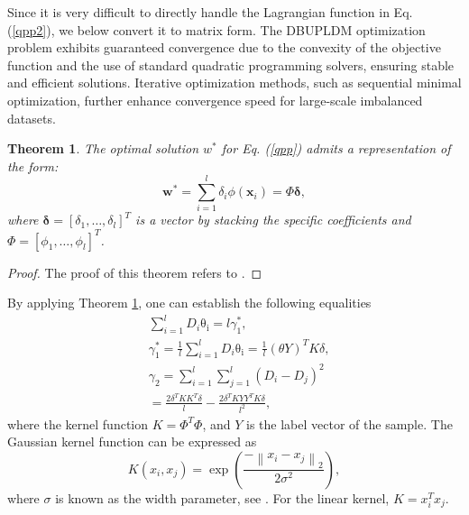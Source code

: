 \documentclass[a4paper]{cas-sc}
\newtheorem{myTheo}{Theorem}
\begin{document}
Since it is very difficult to directly handle the Lagrangian function in Eq. (\ref{qpp2}), we below convert it to matrix form. 
{\color{blue}The DBUPLDM optimization problem exhibits guaranteed convergence due to the convexity of the objective function and the use of standard quadratic programming solvers,  ensuring stable and efficient solutions. Iterative optimization methods, such as sequential minimal optimization, further enhance convergence speed for large-scale imbalanced datasets.}
\begin{myTheo}
\label{theo1}
The optimal solution $w^*$ for Eq. (\ref{qpp}) admits a representation of the form:
\begin{equation}
\label{thor}
\boldsymbol{w}^{*}=\sum_{i=1}^{l} \delta_{i} \phi\left(\boldsymbol{x}_{i}\right)=\Phi \boldsymbol{\delta},
\end{equation}
where $\boldsymbol{\delta}=\left[\delta_{1}, \ldots, \delta_{l}\right]^{T}$ is a vector by stacking the specific coefficients and $\Phi=\left[\phi_{1}, \ldots, \phi_{l}\right]^{T}$.
\end{myTheo}

\begin{proof}
The proof of this theorem refers to \citep{smola2002support}.
\end{proof}

By applying Theorem \ref{theo1}, one can establish the following equalities
\begin{equation}
\label{thor2}
\begin{aligned}
&\sum_{i=1}^{l} {D}_{i}\mathrm{\theta_i} =l \gamma_{1}^*, \\
&\gamma_{1}^* =\frac{1}{l} \sum_{i=1}^{l} {D}_{i}\mathrm{\theta_i}=\frac{1}{l} (\mathbb{\theta}Y)^{T} K \delta, \\
&\gamma_{2} =\sum_{i=1}^{l} \sum_{j=1}^{l}\left(D_{i}-D_{j}\right)^{2} \\
&=\frac{2 \delta^{T} K K^{T} \delta}{l}-\frac{2 \delta^{T} K Y Y^{T} K \delta}{l^{2}},
\end{aligned}
\end{equation}
where the kernel function $K = {\Phi^T}\Phi$, and $Y$ is the label vector of the sample. The Gaussian kernel function can be expressed as
\begin{equation}
\label{gaosikenl}
K\left(x_{i}, x_{j}\right)=\exp \left(\frac{-\left\|x_{i}-x_{j}\right\|_{2}}{2 \sigma^{2}}\right),
\end{equation}
where $\sigma$ is known as the width parameter, see \citep{scholkopf2002learning}. For the linear kernel, $K = x_{i}^{T} x_{j}$. 
\end{document}
